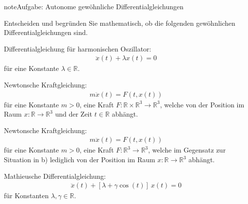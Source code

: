 \documentclass[letterpaper,10pt,english]{jupyterBook}
\begin{document}
\begin{sphinxadmonition}{note}{Aufgabe: Autonome gewöhnliche Differentialgleichungen}

\sphinxAtStartPar
Entscheiden und begründen Sie mathematisch, ob die folgenden gewöhnlichen Differentialgleichungen  sind.

\sphinxAtStartPar
{} Differentialgleichung für harmonischen Oszillator:
\begin{equation*}
\begin{split}\ddot x(t) + \lambda x(t) = 0\end{split}
\end{equation*}
\sphinxAtStartPar
für eine Konstante \(\lambda \in \mathbb{R}\).

\sphinxAtStartPar
{} Newtonsche Kraftgleichung:
\begin{equation*}
\begin{split}m \ddot x(t) = F(t, x(t))\end{split}
\end{equation*}
\sphinxAtStartPar
für eine Konstante \(m > 0\), eine Kraft \(F: \mathbb{R} \times \mathbb{R}^3 \rightarrow \mathbb{R}^3\), welche von der Position im Raum \(x: \mathbb{R} \rightarrow \mathbb{R}^3\) und der Zeit \(t \in \mathbb{R}\) abhängt.

\sphinxAtStartPar
{} Newtonsche Kraftgleichung:
\begin{equation*}
\begin{split}m \ddot x(t) = F(t, x(t))\end{split}
\end{equation*}
\sphinxAtStartPar
für eine Konstante \(m > 0\), eine Kraft \(F: \mathbb{R}^3 \rightarrow \mathbb{R}^3\), welche im Gegensatz zur Situation in b) lediglich von der Position im Raum \(x: \mathbb{R} \rightarrow \mathbb{R}^3\) abhängt.

\sphinxAtStartPar
{} Mathieusche Differentialgleichung:
\begin{equation*}
\begin{split}\ddot x(t) + [\lambda + \gamma \cos(t)] ~ x(t) = 0\end{split}
\end{equation*}
\sphinxAtStartPar
für Konstanten \(\lambda, \gamma \in \mathbb{R}\).
\end{sphinxadmonition}
\end{document}
